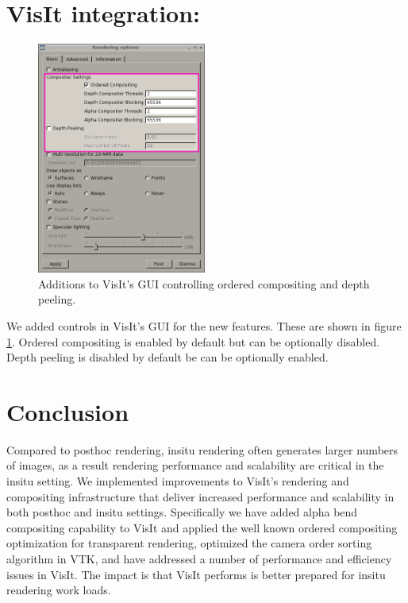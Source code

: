 \documentclass[a4paper,10pt]{report}
\begin{document}
\section{VisIt integration:}
\begin{figure}
 \centering
 \includegraphics[height=3in]{./settings_window.png}
 \caption{Additions to VisIt's GUI controlling ordered compositing and depth peeling.}
 \label{fig:settings}
\end{figure}
We added controls in VisIt's GUI for the new features. These are shown in figure \ref{fig:settings}. Ordered compositing is enabled by default but can be optionally  disabled. Depth peeling is disabled by default be can be optionally enabled.

\section{Conclusion}
Compared to posthoc rendering, insitu rendering often generates larger numbers of images, as a result rendering performance and scalability are critical in the insitu setting. We implemented improvements to VisIt's rendering and compositing infrastructure that deliver increased performance and scalability in both posthoc and insitu settings. Specifically we have added alpha bend compositing capability to VisIt and applied the well known ordered compositing optimization for transparent rendering, optimized the camera order sorting algorithm in VTK, and have addressed a number of performance and efficiency issues in VisIt. The impact is that VisIt performs is better prepared for insitu rendering work loads.
\end{document}
